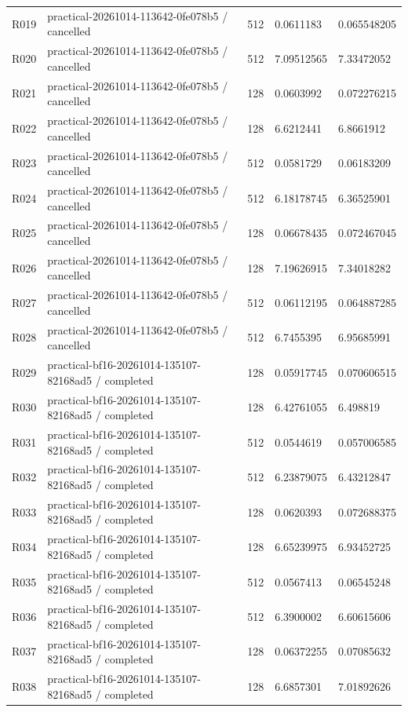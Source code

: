 \documentclass[10pt]{article}
\begin{document}
{\begin{longtable}{p{}p{}p{}p{}p{}}
R019 & practical-20261014-113642-0fe078b5 / cancelled & 512 & 0.0611183 & 0.065548205 \\
R020 & practical-20261014-113642-0fe078b5 / cancelled & 512 & 7.09512565 & 7.33472052 \\
R021 & practical-20261014-113642-0fe078b5 / cancelled & 128 & 0.0603992 & 0.072276215 \\
R022 & practical-20261014-113642-0fe078b5 / cancelled & 128 & 6.6212441 & 6.8661912 \\
R023 & practical-20261014-113642-0fe078b5 / cancelled & 512 & 0.0581729 & 0.06183209 \\
R024 & practical-20261014-113642-0fe078b5 / cancelled & 512 & 6.18178745 & 6.36525901 \\
R025 & practical-20261014-113642-0fe078b5 / cancelled & 128 & 0.06678435 & 0.072467045 \\
R026 & practical-20261014-113642-0fe078b5 / cancelled & 128 & 7.19626915 & 7.34018282 \\
R027 & practical-20261014-113642-0fe078b5 / cancelled & 512 & 0.06112195 & 0.064887285 \\
R028 & practical-20261014-113642-0fe078b5 / cancelled & 512 & 6.7455395 & 6.95685991 \\
R029 & practical-bf16-20261014-135107-82168ad5 / completed & 128 & 0.05917745 & 0.070606515 \\
R030 & practical-bf16-20261014-135107-82168ad5 / completed & 128 & 6.42761055 & 6.498819 \\
R031 & practical-bf16-20261014-135107-82168ad5 / completed & 512 & 0.0544619 & 0.057006585 \\
R032 & practical-bf16-20261014-135107-82168ad5 / completed & 512 & 6.23879075 & 6.43212847 \\
R033 & practical-bf16-20261014-135107-82168ad5 / completed & 128 & 0.0620393 & 0.072688375 \\
R034 & practical-bf16-20261014-135107-82168ad5 / completed & 128 & 6.65239975 & 6.93452725 \\
R035 & practical-bf16-20261014-135107-82168ad5 / completed & 512 & 0.0567413 & 0.06545248 \\
R036 & practical-bf16-20261014-135107-82168ad5 / completed & 512 & 6.3900002 & 6.60615606 \\
R037 & practical-bf16-20261014-135107-82168ad5 / completed & 128 & 0.06372255 & 0.07085632 \\
R038 & practical-bf16-20261014-135107-82168ad5 / completed & 128 & 6.6857301 & 7.01892626 \\

\end{longtable}}
\end{document}
